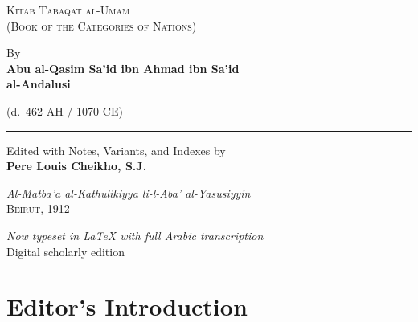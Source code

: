 \documentclass[11pt,a4paper]{article}
\newcommand{\shortline}{\noindent\rule{0.5\textwidth}{0.4pt}\par}
\begin{document}
\thispagestyle{empty}
\begin{center}
\vspace*{3cm}

{\Huge\textsc{Kitab Tabaqat al-Umam}}\\[0.5cm]
{\Large\textsc{(Book of the Categories of Nations)}}

\vspace{1.5cm}

{\large By}\\[0.3cm]
{\LARGE\textbf{Abu al-Qasim Sa'id ibn Ahmad ibn Sa'id\\al-Andalusi}}

\vspace{0.5cm}

(d.~462 AH / 1070 CE)

\vspace{2cm}

\shortline

\vspace{1cm}

{\large Edited with Notes, Variants, and Indexes by}\\[0.3cm]
{\Large\textbf{Pere Louis Cheikho, S.J.}}

\vspace{2cm}

\textit{Al-Matba'a al-Kathulikiyya li-l-Aba' al-Yasusiyyin}\\
\textsc{Beirut, 1912}

\vspace{1cm}

\textit{Now typeset in LaTeX with full Arabic transcription}\\
Digital scholarly edition

\end{center}

\clearpage

\tableofcontents
\clearpage

\section*{Editor's Introduction}
\end{document}
